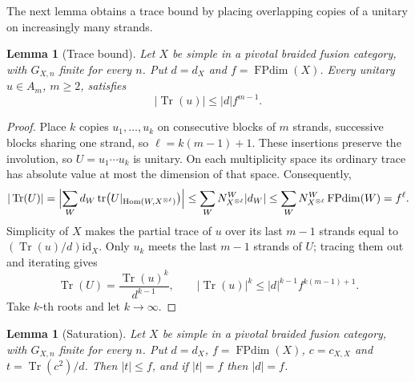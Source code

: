 \documentclass[11pt,oneside]{amsart}
\newtheorem{lemma}[theorem]{Lemma}
\theoremstyle{remark}
\newcommand{\FP}{\operatorname{FPdim}}
\newcommand{\Tr}{\operatorname{Tr}}
\newcommand{\tr}{\operatorname{tr}}
\newcommand{\Hom}{\operatorname{Hom}}
\newcommand{\id}{\mathrm{id}}
\begin{document}
The next lemma obtains a trace bound by placing overlapping copies of a unitary
on increasingly many strands.

\begin{lemma}[Trace bound]\label{lem:trace}
Let $X$ be simple in a pivotal braided fusion category, with $G_{X,n}$ finite
for every $n$. Put $d=d_X$ and $f=\FP(X)$. Every unitary $u\in A_m$, $m\ge2$,
satisfies
\[
|\Tr(u)|\le|d|f^{m-1}.
\]
\end{lemma}

\begin{proof}
Place $k$ copies $u_1,\dots,u_k$ on consecutive blocks of $m$ strands,
successive blocks sharing one strand, so $\ell=k(m-1)+1$. These insertions
preserve the involution, so $U=u_1\cdots u_k$ is unitary. On each multiplicity
space its ordinary trace has absolute value at most the dimension of that
space. Consequently,
\[
|\Tr(U)|=\Bigl|\sum_Wd_W\tr\bigl(U|_{\Hom(W,X^{\otimes\ell})}\bigr)\Bigr|
\le\sum_WN^W_{X^{\otimes\ell}}|d_W|\le\sum_WN^W_{X^{\otimes\ell}}\FP(W)=f^\ell.
\]
Simplicity of $X$ makes the partial trace of $u$ over its last $m-1$ strands
equal to $(\Tr(u)/d)\id_X$. Only $u_k$ meets the last $m-1$ strands of $U$;
tracing them out and iterating gives
\[
\Tr(U)=\frac{\Tr(u)^k}{d^{k-1}},\qquad |\Tr(u)|^k\le|d|^{k-1}f^{k(m-1)+1}.
\]
Take $k$-th roots and let $k\to\infty$.
\end{proof}

\begin{lemma}[Saturation]\label{lem:saturation}
Let $X$ be simple in a pivotal braided fusion category, with $G_{X,n}$ finite
for every $n$. Put $d=d_X$, $f=\FP(X)$, $c=c_{X,X}$ and $t=\Tr(c^2)/d$. Then
$|t|\le f$, and if $|t|=f$ then $|d|=f$.
\end{lemma}
\end{document}

